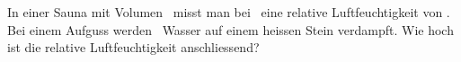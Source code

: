 In einer Sauna mit Volumen \VSO\ misst man bei \thSO\ eine relative Luftfeuchtigkeit von \fiAO. Bei einem Aufguss werden \VWaO\ Wasser auf einem heissen Stein verdampft. Wie hoch ist die relative Luftfeuchtigkeit anschliessend?
